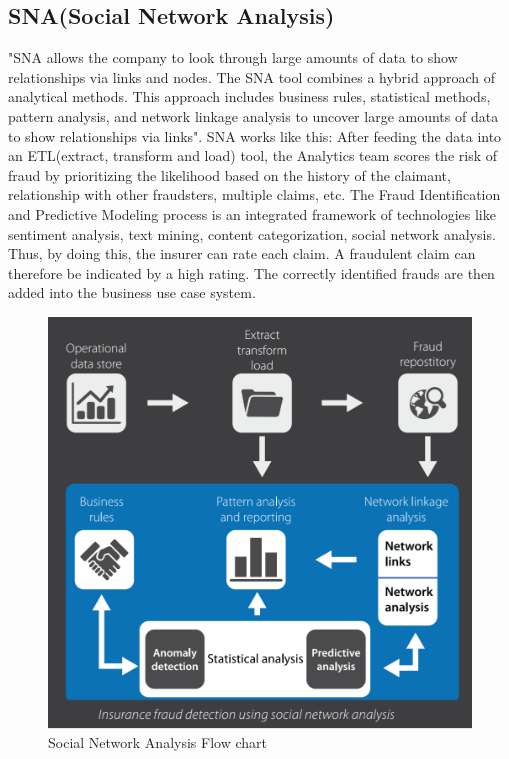 \documentclass[sigconf]{acmart}
\begin{document}
\subsection{SNA(Social Network Analysis)}
"SNA allows the company to look through large amounts of data to show relationships via links and nodes. The SNA tool combines a hybrid approach of analytical methods. This approach includes business rules, statistical methods, pattern analysis, and network linkage analysis to uncover large amounts of data to show relationships via links". 
SNA works like this: After feeding the data into an ETL(extract, transform and load) tool, the Analytics team scores the risk of fraud by prioritizing the likelihood based on the history of the claimant, relationship with other fraudsters, multiple claims, etc. The Fraud Identification and Predictive Modeling process is an integrated framework of technologies like sentiment analysis, text mining, content categorization, social network analysis. Thus, by doing this, the insurer can rate each claim. A fraudulent claim can therefore be indicated by a high rating. The correctly identified frauds are then added into the business use case system.\cite{link7}
\begin{figure}
  \includegraphics[width=\linewidth]{images/SNA_image1.png}
  \caption{Social Network Analysis Flow chart}
  \label{fig:Social Network Analysis flowchart}
\end{figure}
\end{document}
